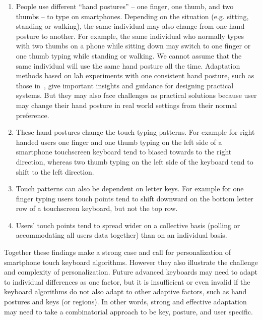 \documentclass{sigchi}
\begin{document}
\begin{enumerate}
\item People use different “hand postures” -- one finger, one thumb, and two thumbs -- to type on smartphones. Depending on the situation (e.g. sitting, standing or walking), the same individual may also change from one hand posture to another. For example, the same individual who normally types with two thumbs on a phone while sitting down may switch to one finger or one thumb typing while standing or walking. We cannot assume that the same individual will use the same hand posture all the time. Adaptation methods based on lab experiments with one consistent hand  posture, such as those in~\cite{Findlater:2012}, give important insights and guidance for designing practical systems. But they may also face challenges as practical solutions because user may change their hand posture in real world settings from their normal preference.

\item These hand postures change the touch typing patterns. For example for right handed users one finger and one thumb typing on the left side of a smartphone touchscreen keyboard tend to biased towards to the right direction, whereas two thumb typing on the left side of the keyboard tend to shift to the left direction.

\item Touch patterns can also be dependent on letter keys. For example for one finger typing users touch points tend to shift downward on the bottom letter row of a touchscreen keyboard, but not the top row. 

\item Users’ touch points tend to spread wider on a collective basis (polling or accommodating all users data together) than on an individual basis.
\end{enumerate}

Together these findings make a strong case and call for personalization of smartphone touch keyboard algorithms. However they also illustrate the challenge and complexity of personalization. Future advanced keyboards may need to adapt to individual differences as one factor,  but it is insufficient or even invalid if the keyboard algorithms do not also adapt to other adaptive factors, such as hand postures and keys (or regions). In other words, strong and effective adaptation may need to  take a combinatorial approach to be key, posture, and user specific. 
\end{document}
